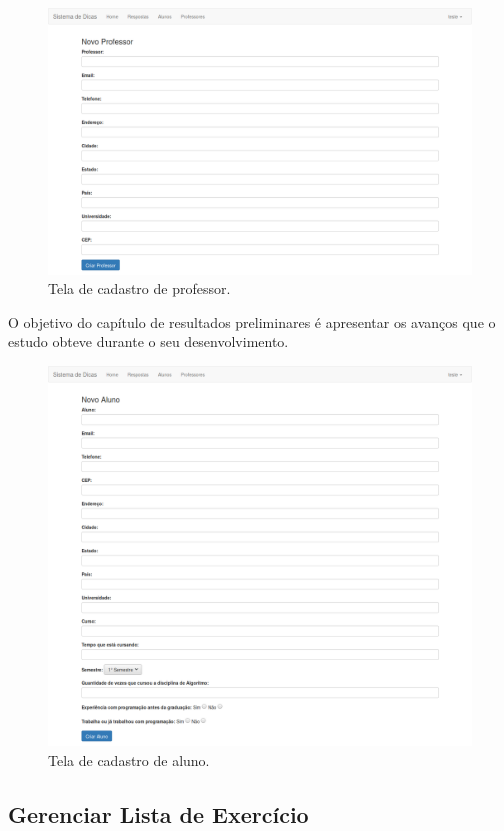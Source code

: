\begin{figure}[]
	\centering
	\captionsetup{justification=centering}
	\includegraphics[width=.8\linewidth]{imagens/cadastroprofessor.png}
	\caption{Tela de cadastro de professor.}
	\label{figura:cadastroprofessor}
\end{figure}
O objetivo do capítulo de resultados preliminares é apresentar os avanços que o estudo obteve durante o seu desenvolvimento.
\begin{figure}[]		
	\centering
	\captionsetup{justification=centering}
	\includegraphics[width=.8\linewidth]{imagens/cadastroaluno.png}
	\caption{Tela de cadastro de aluno.}
	\label{figura:cadastroaluno}
\end{figure}

\frontmatter

\subsection{Gerenciar Lista de Exercício}

